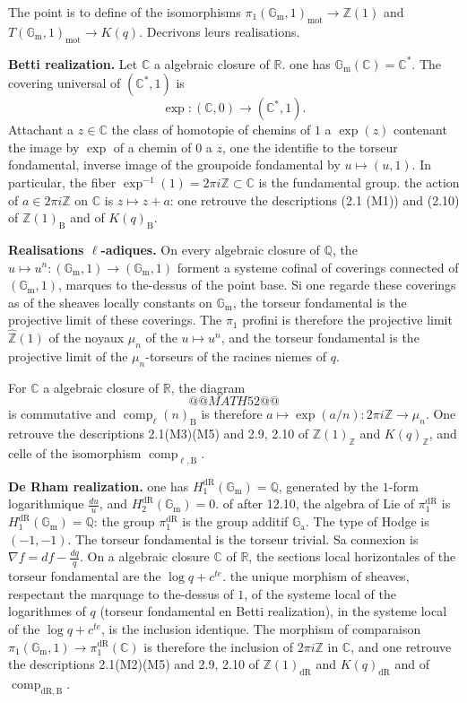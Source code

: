 \documentclass[12pt,a4paper]{article}
\theoremstyle{plain}
\theoremstyle{definition}
\theoremstyle{remark}
\DeclareMathOperator{\comp}{comp}
\newcommand*{\Gm}{\mathbb{G}_\mathrm{m}}
\newcommand{\Ga}{\mathbb{G}_\mathrm{a}}
\newcommand{\bZ}{\mathbb{Z}}
\newcommand{\bQ}{\mathbb{Q}}
\newcommand{\bR}{\mathbb{R}}
\newcommand{\bC}{\mathbb{C}}
\newcommand{\dr}{\mathrm{dR}}
\newcommand{\B}{\mathrm{B}}
\newcommand{\mot}{\mathrm{mot}}
\begin{document}
The point is to define of the isomorphisms $\pi_1(\Gm, 1)_{\mot} \to \bZ(1)$ and $T(\Gm, 1)_{\mot} \to K(q)$. Decrivons leurs realisations.

\textbf{Betti realization.} Let $\bC$ a algebraic closure of $\bR$. one has $\Gm(\bC) = \bC^*$. The covering universal of $(\bC^*, 1)$ is
\[
\exp : (\bC, 0) \to (\bC^*, 1).
\]
Attachant a $z \in \bC$ the class of homotopie of chemins of $1$ a $\exp(z)$ contenant the image by $\exp$ of a chemin of $0$ a $z$, one the identifie to the torseur fondamental, inverse image of the groupoide fondamental by $u \mapsto (u, 1)$. In particular, the fiber $\exp^{-1}(1) = 2\pi i \bZ \subset \bC$ is the fundamental group. the action of $a \in 2\pi i \bZ$ on $\bC$ is $z \mapsto z + a$: one retrouve the descriptions (2.1 (M1)) and (2.10) of $\bZ(1)_{\B}$ and of $K(q)_{\B}$.

\textbf{Realisations $\ell$-adiques.} On every algebraic closure of $\bQ$, the $u \mapsto u^n: (\Gm, 1) \to (\Gm, 1)$ forment a systeme cofinal of coverings connected of $(\Gm, 1)$, marques to the-dessus of the point base. Si one regarde these coverings as of the sheaves locally constants on $\Gm$, the torseur fondamental is the projective limit of these coverings. The $\pi_1$ profini is therefore the projective limit $\hat{\bZ}(1)$ of the noyaux $\mu_n$ of the $u \mapsto u^n$, and the torseur fondamental is the projective limit of the $\mu_n$-torseurs of the racines niemes of $q$.

For $\bC$ a algebraic closure of $\bR$, the diagram
\[
@@MATH52@@
\]
is commutative and $\comp_{\ell}(n)_{\B}$ is therefore $a \mapsto \exp(a/n): 2\pi i \bZ \to \mu_n$. One retrouve the descriptions 2.1(M3)(M5) and 2.9, 2.10 of $\bZ(1)_{\bZ}$ and $K(q)_{\bZ}$, and celle of the isomorphism $\comp_{\ell, \B}$.

\textbf{De Rham realization.} one has $H_1^{\dr}(\Gm) = \bQ$, generated by the $1$-form logarithmique $\frac{du}{u}$, and $H_2^{\dr}(\Gm) = 0$. of after 12.10, the algebra of Lie of $\pi_1^{\dr}$ is $H_{1}^{\dr}(\Gm) = \bQ$: the group $\pi_1^{\dr}$ is the group additif $\Ga$. The type of Hodge is $(-1,-1)$. The torseur fondamental is the torseur trivial. Sa connexion is $\nabla f = df - \frac{dq}{q}$. On a algebraic closure $\bC$ of $\bR$, the sections local horizontales of the torseur fondamental are the $\log q + c^{te}$. the unique morphism of sheaves, respectant the marquage to the-dessus of $1$, of the systeme local of the logarithmes of $q$ (torseur fondamental en Betti realization), in the systeme local of the $\log q + c^{te}$, is the inclusion identique. The morphism of comparaison $\pi_1(\Gm, 1) \to \pi_1^{\dr}(\bC)$ is therefore the inclusion of $2\pi i \bZ$ in $\bC$, and one retrouve the descriptions 2.1(M2)(M5) and 2.9, 2.10 of $\bZ(1)_{\dr}$ and $K(q)_{\dr}$ and of $\comp_{\dr,\B}$.
\end{document}
